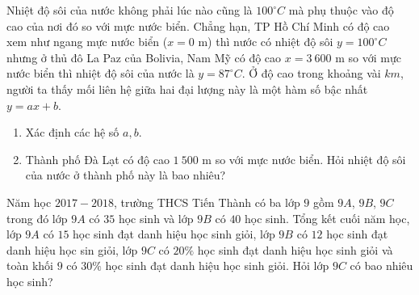 \begin{ex}%
	Nhiệt độ sôi của nước không phải lúc nào cũng là $ 100^\circ C $ mà phụ thuộc vào độ cao của nơi đó so với mực nước biển. Chẳng hạn, TP Hồ Chí Minh có độ cao xem như ngang mực nước biển ($ x=0 $ m) thì nước có nhiệt độ sôi $ y = 100^\circ C $ nhưng ở thủ đô La Paz của Bolivia, Nam Mỹ có độ cao $ x = 3\ 600 $ m so với mực nước biển thì nhiệt độ sôi của nước là $ y = 87^\circ C $. Ở độ cao trong khoảng vài $ km $, người ta thấy mối liên hệ giữa hai đại lượng này là một hàm số bậc nhất $  y = ax + b $.
	\begin{enumerate}
		\item Xác định các hệ số $ a,b $.
		\item Thành phố Đà Lạt có độ cao $ 1\ 500 $ m so với mực nước biển. Hỏi nhiệt độ sôi của nước ở thành phố này là bao nhiêu?
	\end{enumerate}
	
\end{ex}
\begin{ex}%
	Năm học $2017 - 2018$, trường THCS Tiến Thành có ba lớp $9$ gồm $9A$, $9B$, $9C$ trong đó lớp $9A$ có $35$ học sinh và lớp $9B$ có $40$ học sinh. Tổng kết cuối năm học, lớp $9A$ có $15$ học sinh đạt danh hiệu học sinh giỏi, lớp $9B$ có $12$ học sinh đạt danh hiệu học sin giỏi, lớp $9C$ có $ 20\% $ học sinh đạt danh hiệu học sinh giỏi và toàn khối $9$ có $ 30\% $ học sinh đạt danh hiệu học sinh giỏi. Hỏi lớp $9C$ có bao nhiêu học sinh?
\end{ex}
